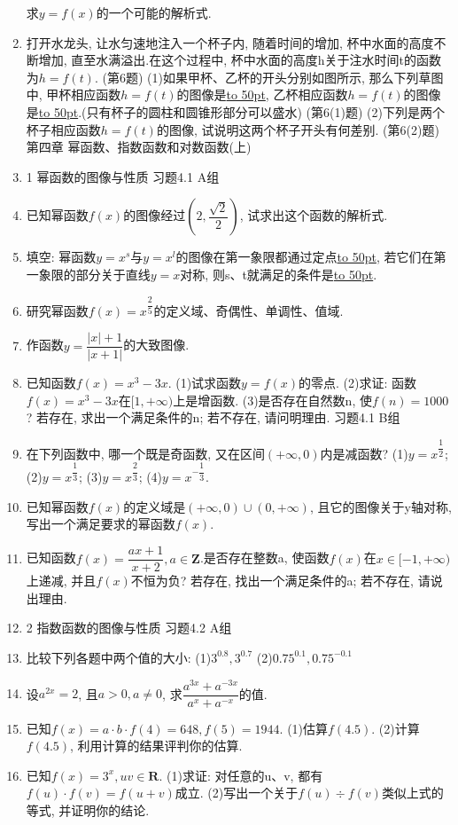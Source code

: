 \documentclass[10pt,a4paper]{article}
\newcommand{\blank}[1]{\underline{\hbox to #1pt{}}}
\begin{document}
\begin{enumerate}[1.]
求$y=f(x)$的一个可能的解析式.
\item 打开水龙头, 让水匀速地注入一个杯子内, 随着时间的增加, 杯中水面的高度不断增加, 直至水满溢出.在这个过程中, 杯中水面的高度h关于注水时间t的函数为$h=f(t)$.
(第6题)
(1)如果甲杯、乙杯的开头分别如图所示, 那么下列草图中, 甲杯相应函数$h=f(t)$的图像是\blank{50}, 乙杯相应函数$h=f(t)$的图像是\blank{50}.(只有杯子的圆柱和圆锥形部分可以盛水)
(第6(1)题)
(2)下列是两个杯子相应函数$h=f(t)$的图像, 试说明这两个杯子开头有何差别.
(第6(2)题)
第四章  幂函数、指数函数和对数函数(上)
\item 1  幂函数的图像与性质
习题4.1  A组
\item 已知幂函数$f(x)$的图像经过$(2,\dfrac{\sqrt 2}2)$, 试求出这个函数的解析式.
\item 填空:
幂函数$y=x^s$与$y=x^l$的图像在第一象限都通过定点\blank{50}, 若它们在第一象限的部分关于直线$y=x$对称, 则s、t就满足的条件是\blank{50}.
\item 研究幂函数$f(x)=x^{\dfrac 25}$的定义域、奇偶性、单调性、值域.
\item 作函数$y=\dfrac{|x|+1}{|x+1|}$的大致图像.
\item 已知函数$f(x)=x^3-3x$.
(1)试求函数$y=f(x)$的零点.
(2)求证: 函数$f(x)=x^3-3x$在$[1,+\infty)$上是增函数.
(3)是否存在自然数n, 使$f(n)=1000$? 若存在, 求出一个满足条件的n; 若不存在, 请问明理由.
习题4.1  B组
\item 在下列函数中, 哪一个既是奇函数, 又在区间$(+\infty ,0)$内是减函数?
(1)$y=x^{\dfrac 12}$; 		(2)$y=x^{\dfrac 13}$; 		(3)$y=x^{\dfrac 23}$; 		(4)$y=x^{-\dfrac 13}$.
\item 已知幂函数$f(x)$的定义域是$(+\infty ,0)\cup (0,+\infty)$, 且它的图像关于y轴对称, 写出一个满足要求的幂函数$f(x)$.
\item 已知函数$f(x)=\dfrac{ax+1}{x+2},a\in \mathbf{Z}$.是否存在整数a, 使函数$f(x)$在$x\in [-1,+\infty)$上递减, 并且$f(x)$不恒为负? 若存在, 找出一个满足条件的a; 若不存在, 请说出理由.
\item 2  指数函数的图像与性质
习题4.2  A组
\item 比较下列各题中两个值的大小:
(1)$3^{0.8},3^{0.7}$							(2)$0.75^{0.1},0.75^{-0.1}$
\item 设$a^{2x}=2$, 且$a>0,a\ne 0$, 求$\dfrac{{a^{3x}}+{a^{-3x}}}{{a^x}+{a^{-x}}}$的值.
\item 已知$f(x)=a\cdot b\cdot f(4)=648,f(5)=1944$.
(1)估算$f(4.5)$.
(2)计算$f(4.5)$, 利用计算的结果评判你的估算.
\item 已知$f(x)=3^x,uv\in \mathbf{R}$.
(1)求证: 对任意的u、v, 都有$f(u)\cdot f(v)=f(u+v)$成立.
(2)写出一个关于$f(u)\div f(v)$类似上式的等式, 并证明你的结论.

\end{enumerate}
\end{document}
